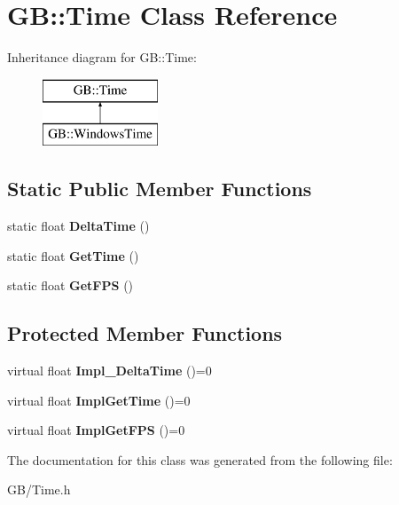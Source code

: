 \hypertarget{class_g_b_1_1_time}{}\section{GB\+::Time Class Reference}
\label{class_g_b_1_1_time}
Inheritance diagram for GB\+::Time\+:\begin{figure}[H]
\begin{center}
\leavevmode
\includegraphics[height=2.000000cm]{class_g_b_1_1_time}
\end{center}
\end{figure}
\subsection*{Static Public Member Functions}
\begin{DoxyCompactItemize}
\item 
\mbox{\label{class_g_b_1_1_time_a749f654eeb21ca960f4b6b65c44ed269}} 
static float {\bfseries Delta\+Time} ()
\item 
\mbox{\label{class_g_b_1_1_time_af98774d8545eb845ae77b9235b5dd47e}} 
static float {\bfseries Get\+Time} ()
\item 
\mbox{\label{class_g_b_1_1_time_af991729e43ef69973b99183bf5d4b824}} 
static float {\bfseries Get\+F\+PS} ()
\end{DoxyCompactItemize}
\subsection*{Protected Member Functions}
\begin{DoxyCompactItemize}
\item 
\mbox{\label{class_g_b_1_1_time_abba2a0c290df15da25f83de72c9cb9d8}} 
virtual float {\bfseries Impl\+\_\+\+Delta\+Time} ()=0
\item 
\mbox{\label{class_g_b_1_1_time_aea6543f53b9b6bc24dbe5cb43c24f0a3}} 
virtual float {\bfseries Impl\+Get\+Time} ()=0
\item 
\mbox{\label{class_g_b_1_1_time_a4f019a00c06ab044c9b2a20906e4cef4}} 
virtual float {\bfseries Impl\+Get\+F\+PS} ()=0
\end{DoxyCompactItemize}


The documentation for this class was generated from the following file\+:\begin{DoxyCompactItemize}
\item 
G\+B/Time.\+h\end{DoxyCompactItemize}
